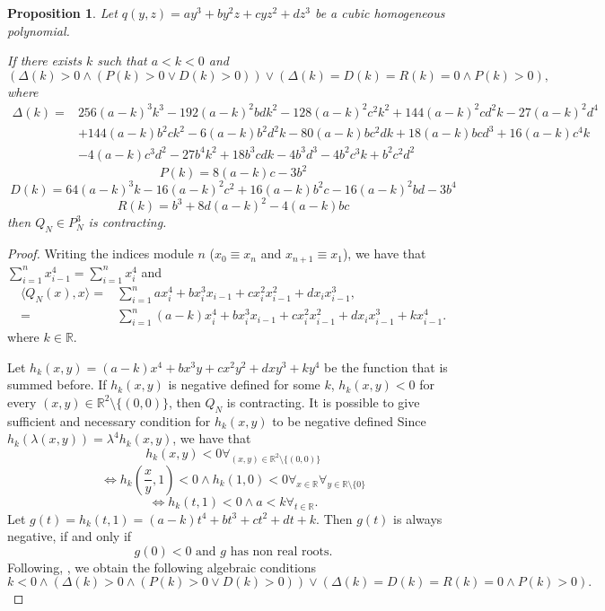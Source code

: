 \documentclass{article}
\newtheorem{prop}{Proposition}
\theoremstyle{definition}
\begin{document}
\begin{prop}\label{prop:contrac}
Let $q(y,z)=a y^3+b y^2z+c yz^2+d z^3$ be a cubic homogeneous polynomial.

If there exists $k$ such that $a<k<0$ and 
$$(\Delta(k)>0 \wedge (P(k)> 0 \vee D(k)> 0)) \vee (\Delta(k)=D(k)=R(k)=0 \wedge P(k)>0),$$
where 
$$\begin{aligned}
\Delta(k) ={}&256(a-k)^{3}k^{3}-192(a-k)^{2}bdk^{2}-128(a-k)^{2}c^{2}k^{2}+144(a-k)^{2}cd^{2}k-27(a-k)^{2}d^{4}\\
&+144(a-k)b^{2}ck^{2}-6(a-k)b^{2}d^{2}k-80(a-k)bc^{2}dk+18(a-k)bcd^{3}+16(a-k)c^{4}k\\
&-4(a-k)c^{3}d^{2}-27b^{4}k^{2}+18b^{3}cdk-4b^{3}d^{3}-4b^{2}c^{3}k+b^{2}c^{2}d^{2}
\end{aligned}$$
$$P(k)=8(a-k)c-3b^{2}$$
$$D(k)=64(a-k)^{3}k-16(a-k)^{2}c^{2}+16(a-k)b^{2}c-16(a-k)^{2}bd-3b^{4}$$
$$R(k)=b^{3}+8d(a-k)^{2}-4(a-k)bc$$
then $Q_N\in P_N^{3}$ is contracting.
\end{prop}

\begin{proof}
Writing the indices module $n$ ($x_0\equiv x_n$ and $x_{n+1}\equiv x_1$), we have that
$\sum_{i=1}^n x_{i-1}^4= \sum_{i=1}^n x_i^4$ and 
\begin{align*}
\langle Q_N(x),x\rangle=&\sum_{i=1}^n a x_i^4+b x_i^3x_{i-1}+c x_i^2x_{i-1}^2+d x_ix_{i-1}^3,\\
=&\sum_{i=1}^n (a-k) x_i^4+b x_i^3x_{i-1}+c x_i^2x_{i-1}^2+d x_ix_{i-1}^3+k x_{i-1}^4.
\end{align*}
where $k\in\mathbb{R}$.

Let $h_k(x,y)=(a-k) x^4+b x^3y+c x^2y^2+d x y^3+k y^4$ be the function that is summed before. 
If $h_k(x,y)$ is negative defined for some $k$, $h_k(x,y)< 0$ for every $(x,y)\in\mathbb{R}^2\setminus \{(0,0)\}$, then $Q_N$ is contracting.
It is possible to give sufficient and necessary condition for $h_k(x,y)$ to be negative defined
Since $h_k(\lambda (x,y))=\lambda^4 h_k(x,y)$, we have that 
$$h_k(x,y)< 0 \forall_{(x,y)\in\mathbb{R}^2\setminus \{(0,0)\}}$$
$$\Leftrightarrow h_k(\dfrac{x}{y},1)<0 \wedge h_k(1,0)<0 \forall_{x\in\mathbb{R}}\forall_{y\in \mathbb{R}\setminus\{0\}}$$
$$\Leftrightarrow h_k(t,1)<0 \wedge a<k \forall_{t\in\mathbb{R}}.$$
Let $g(t)=h_k(t,1)=(a-k) t^4+b t^3+c t^2+d t +k$. 
Then $g(t)$ is always negative, if and only if
$$g(0)<0 \textrm{ and $g$ has non real roots.}$$
Following, \cite{Y99,L88}, we obtain the following algebraic conditions
$$k<0 \wedge (\Delta(k)>0 \wedge (P(k)> 0 \vee D(k)> 0)) \vee (\Delta(k)=D(k)=R(k)=0 \wedge P(k)>0).$$
\end{proof}
\end{document}
